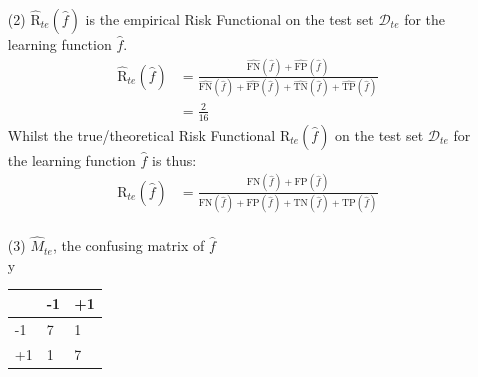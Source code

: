 \documentclass[12pt,a4paper]{article}
\begin{document}
\begin{enumerate}
	\item[(2)] $\widehat{\text{R}}_{te}(\widehat{f})$ is the empirical Risk Functional on the test set $\mathscr{D}_{te}$ for the learning function  $\widehat{f}$. 
			\begin{align*}
						\widehat{\text{R}}_{te}(\widehat{f})  &= \frac{ \widehat{ \text{FN} }(\widehat{f}) + \widehat{ \text{FP} }(\widehat{f})  }{  \widehat{ \text{FN} }(\widehat{f}) + \widehat{ \text{FP} }(\widehat{f})  + \widehat{ \text{TN} }(\widehat{f}) + \widehat{ \text{TP} }(\widehat{f})  }\\
						&= \frac{2}{16}
			\end{align*}
Whilst the true/theoretical Risk Functional $\text{R}_{te}(\widehat{f})$ on  the test set $\mathscr{D}_{te}$ for the learning function  $\widehat{f}$ is thus:
			\begin{align*}
						\text{R}_{te}(\widehat{f})  &=  \frac{ \text{FN} (\widehat{f}) + \text{FP} (\widehat{f})  }{  \text{FN} (\widehat{f}) + \text{FP} (\widehat{f})  +  \text{TN} (\widehat{f}) + \text{TP} (\widehat{f})  }\\
			\end{align*}
	\item[(3)] 	$\widehat{M}_{te} $, the confusing matrix of $\widehat{f}$ \vspace{0.7cm} \\
             \vspace{1.2cm}
            $\text{y}$
				\begin{tabular}{|l|l|l|}
					\hline
 					& -1 & +1 \\ \hline
				-1 & 7 & 1 \\ \hline
				+1 & 1 & 7 \\ \hline
				\end{tabular}
	

\end{enumerate}
\end{document}
